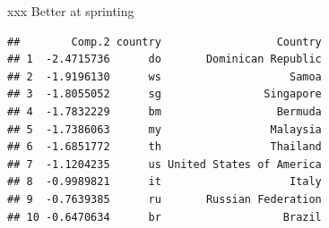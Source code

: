 \documentclass[ignorenonframetext,]{beamer}
\newenvironment{Shaded}{\begin{snugshade}}{\end{snugshade}}
\newcommand{\DataTypeTok}[1]{\textcolor[rgb]{0.13,0.29,0.53}{#1}}
\newcommand{\DecValTok}[1]{\textcolor[rgb]{0.00,0.00,0.81}{#1}}
\newcommand{\FloatTok}[1]{\textcolor[rgb]{0.00,0.00,0.81}{#1}}
\newcommand{\KeywordTok}[1]{\textcolor[rgb]{0.13,0.29,0.53}{\textbf{#1}}}
\newcommand{\NormalTok}[1]{#1}
\newcommand{\OperatorTok}[1]{\textcolor[rgb]{0.81,0.36,0.00}{\textbf{#1}}}
\newcommand{\StringTok}[1]{\textcolor[rgb]{0.31,0.60,0.02}{#1}}
\begin{document}
\begin{frame}[fragile]{xxx Better at sprinting}
\protect\hypertarget{xxx-better-at-sprinting}{}

\begin{Shaded}
\end{Shaded}

\begin{verbatim}
##        Comp.2 country                  Country
## 1  -2.4715736      do       Dominican Republic
## 2  -1.9196130      ws                    Samoa
## 3  -1.8055052      sg                Singapore
## 4  -1.7832229      bm                  Bermuda
## 5  -1.7386063      my                 Malaysia
## 6  -1.6851772      th                 Thailand
## 7  -1.1204235      us United States of America
## 8  -0.9989821      it                    Italy
## 9  -0.7639385      ru       Russian Federation
## 10 -0.6470634      br                   Brazil
\end{verbatim}

\end{frame}
\end{document}
